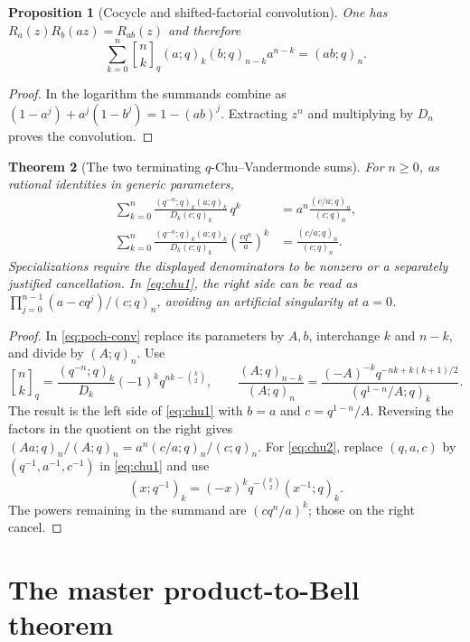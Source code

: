 \documentclass[11pt,a4paper]{article}
\numberwithin{equation}{section}
\newtheorem{theorem}{Theorem}[section]
\newtheorem{proposition}[theorem]{Proposition}
\theoremstyle{definition}
\theoremstyle{remark}
\newcommand{\qb}[2]{\genfrac{[}{]}{0pt}{}{#1}{#2}_{q}}
\newcommand{\poch}[3]{(#1;#2)_{#3}}
\begin{document}
\begin{proposition}[Cocycle and shifted-factorial convolution]
\label{prop:cocycle}
One has $R_a(z)R_b(az)=R_{ab}(z)$ and therefore
\begin{equation}\label{eq:poch-conv}
 \sum_{k=0}^n\qb nk\poch a q k\poch b q{n-k}a^{n-k}
       =\poch{ab}q n.
\end{equation}
\end{proposition}
\begin{proof}
In the logarithm the summands combine as
$(1-a^j)+a^j(1-b^j)=1-(ab)^j$. Extracting $z^n$ and multiplying by $D_n$
proves the convolution.
\end{proof}

\begin{theorem}[The two terminating $q$-Chu--Vandermonde sums]\label{thm:chu}
For $n\ge0$, as rational identities in generic parameters,
\begin{align}
 \sum_{k=0}^n\frac{\poch{q^{-n}}qk\poch a q k}
                         {D_k\poch c q k}\,q^k
 &=a^n\frac{\poch{c/a}q n}{\poch c q n},\label{eq:chu1}\\
 \sum_{k=0}^n\frac{\poch{q^{-n}}qk\poch a q k}
                         {D_k\poch c q k}
                    \left(\frac{cq^n}{a}\right)^k
 &=\frac{\poch{c/a}q n}{\poch c q n}.\label{eq:chu2}
\end{align}
Specializations require the displayed denominators to be nonzero or a separately
justified cancellation. In \eqref{eq:chu1}, the right side can be read as
$\prod_{j=0}^{n-1}(a-cq^j)/\poch c q n$, avoiding an artificial singularity at $a=0$.
\end{theorem}
\begin{proof}
In \eqref{eq:poch-conv} replace its parameters by $A,b$, interchange $k$ and
$n-k$, and divide by $\poch A q n$. Use
\[
 \qb nk=\frac{\poch{q^{-n}}qk}{D_k}(-1)^kq^{nk-\binom k2},\qquad
 \frac{\poch A q{n-k}}{\poch A q n}
  =\frac{(-A)^{-k}q^{-nk+k(k+1)/2}}
         {\poch{q^{1-n}/A}qk}.
\]
The result is the left side of \eqref{eq:chu1} with $b=a$ and
$c=q^{1-n}/A$. Reversing the factors in the quotient on the right gives
$\poch{Aa}q n/\poch A q n=a^n\poch{c/a}q n/\poch c q n$.
For \eqref{eq:chu2}, replace $(q,a,c)$ by $(q^{-1},a^{-1},c^{-1})$ in
\eqref{eq:chu1} and use
\[
 \poch{x}{q^{-1}}k=(-x)^kq^{-\binom k2}\poch{x^{-1}}qk.
\]
The powers remaining in the summand are $(cq^n/a)^k$; those on the right cancel.
\end{proof}

\section{The master product-to-Bell theorem}\label{sec:master}
\end{document}
